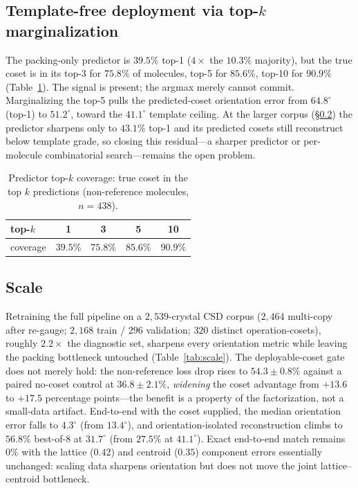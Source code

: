 \documentclass[journal=jcisd8,manuscript=article]{achemso}
\begin{document}
\subsection{Template-free deployment via top-$k$ marginalization}\label{sec:free}
The packing-only predictor is $39.5\%$ top-1 ($4\times$ the $10.3\%$ majority), but
the true coset is in its top-3 for $75.8\%$ of molecules, top-5 for $85.6\%$,
top-10 for $90.9\%$ (Table~\ref{tab:cover}). The signal is present; the argmax
merely cannot commit. Marginalizing the top-5 pulls the predicted-coset orientation
error from $64.8^\circ$ (top-1) to $51.2^\circ$, toward the $41.1^\circ$ template
ceiling. At the larger corpus (\S\ref{sec:scale}) the predictor sharpens only to
$43.1\%$ top-1 and its predicted cosets still reconstruct below template grade, so
closing this residual---a sharper predictor or per-molecule combinatorial
search---remains the open problem.

\begin{table}[t]\centering
\caption{Predictor top-$k$ coverage: true coset in the top $k$ predictions
(non-reference molecules, $n{=}438$).}
\label{tab:cover}
\begin{tabular}{lcccc}\toprule
top-$k$ & 1 & 3 & 5 & 10 \\\midrule
coverage & $39.5\%$ & $75.8\%$ & $85.6\%$ & $90.9\%$ \\\bottomrule
\end{tabular}
\end{table}

\subsection{Scale}\label{sec:scale}
Retraining the full pipeline on a $2{,}539$-crystal CSD corpus ($2{,}464$
multi-copy after re-gauge; $2{,}168$ train / $296$ validation; $320$ distinct
operation-cosets), roughly $2.2\times$ the diagnostic set, sharpens every
orientation metric while leaving the packing bottleneck untouched
(Table~\ref{tab:scale}). The deployable-coset gate does not merely hold: the
non-reference loss drop rises to $54.3\pm0.8\%$ against a paired no-coset control at
$36.8\pm2.1\%$, \emph{widening} the coset advantage from $+13.6$ to $+17.5$
percentage points---the benefit is a property of the factorization, not a
small-data artifact. End-to-end with the coset supplied, the median orientation
error falls to $4.3^\circ$ (from $13.4^\circ$), and orientation-isolated
reconstruction climbs to $56.8\%$ best-of-$8$ at $31.7^\circ$ (from $27.5\%$ at
$41.1^\circ$). Exact end-to-end match remains $0\%$ with the lattice ($0.42$) and
centroid ($0.35$) component errors essentially unchanged: scaling data sharpens
orientation but does not move the joint lattice--centroid bottleneck.
\end{document}
